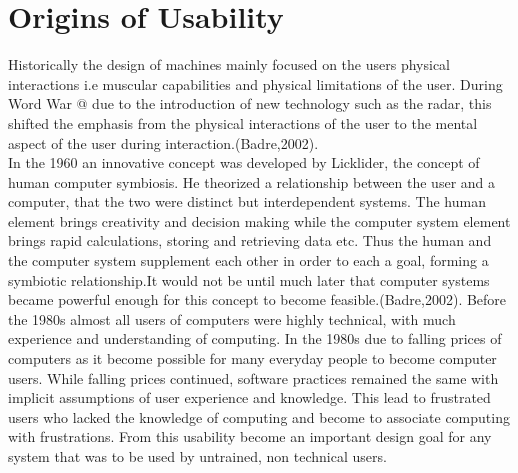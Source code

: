 \documentclass[a4paper,oneside,11pt]{report}
\makeatletter
\newcommand*{\rom}[1]{\expandafter\@slowromancap\romannumeral #1@}
\makeatother
\begin{document}
\section{Origins of Usability}
Historically the design of machines mainly focused on the users physical interactions i.e muscular capabilities and physical limitations of the user. During Word War \rom{2} due to the introduction of new technology such as the radar, this shifted the emphasis from the physical interactions of the user to the mental aspect of the user during interaction.(Badre,2002). \\
In the 1960 an innovative concept was developed by Licklider, the concept of human computer symbiosis. He theorized a relationship between the user and a computer, that the two were distinct but interdependent systems. The human element brings creativity and decision making while the computer system element brings rapid calculations, storing and retrieving data etc. Thus the human and the computer system supplement each other in order to each a goal, forming a symbiotic relationship.It would not be until much later that computer systems became powerful enough for this concept to become feasible.(Badre,2002).
Before the 1980s almost all users of computers were highly technical, with much experience and understanding of computing. In the 1980s due to falling prices of computers as it become possible for many everyday people to become computer users. While falling prices continued, software practices remained the same with implicit assumptions of user experience and knowledge. This lead to frustrated users who lacked the knowledge of computing and become to associate computing with frustrations. From this usability become an important design goal for any system that was to be used by untrained, non technical users.
\end{document}
